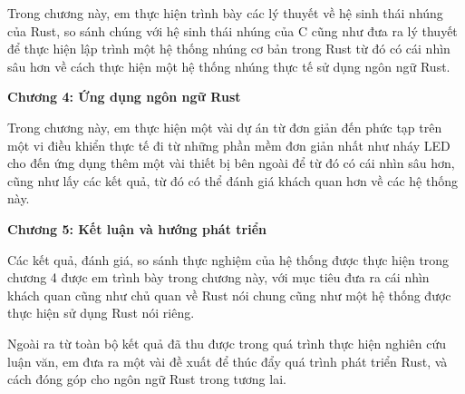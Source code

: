 Trong chương này, em thực hiện trình bày các lý thuyết về hệ sinh thái nhúng của Rust, so sánh chúng với hệ sinh thái nhúng của C cũng như đưa ra lý thuyết để thực hiện lập trình một hệ thống nhúng cơ bản trong Rust từ đó có cái nhìn sâu hơn về cách thực hiện một hệ thống nhúng thực tế sử dụng ngôn ngữ Rust.

\textbf{Chương 4: Ứng dụng ngôn ngữ Rust}

Trong chương này, em thực hiện một vài dự án từ đơn giản đến phức tạp trên một vi điều khiển thực tế đi từ những phần mềm đơn giản nhất như nháy LED cho đến ứng dụng thêm một vài thiết bị bên ngoài để từ đó có cái nhìn sâu hơn, cũng như lấy các kết quả, từ đó có thể đánh giá khách quan hơn về các hệ thống này.

\textbf{Chương 5: Kết luận và hướng phát triển}

Các kết quả, đánh giá, so sánh thực nghiệm của hệ thống được thực hiện trong chương 4 được em trình bày trong chương này, với mục tiêu đưa ra cái nhìn khách quan cũng như chủ quan về Rust nói chung cũng như một hệ thống được thực hiện sử dụng Rust nói riêng.

Ngoài ra từ toàn bộ kết quả đã thu được trong quá trình thực hiện nghiên cứu luận văn, em đưa ra một vài đề xuất để thúc đẩy quá trình phát triển Rust, và cách đóng góp cho ngôn ngữ Rust trong tương lai.
